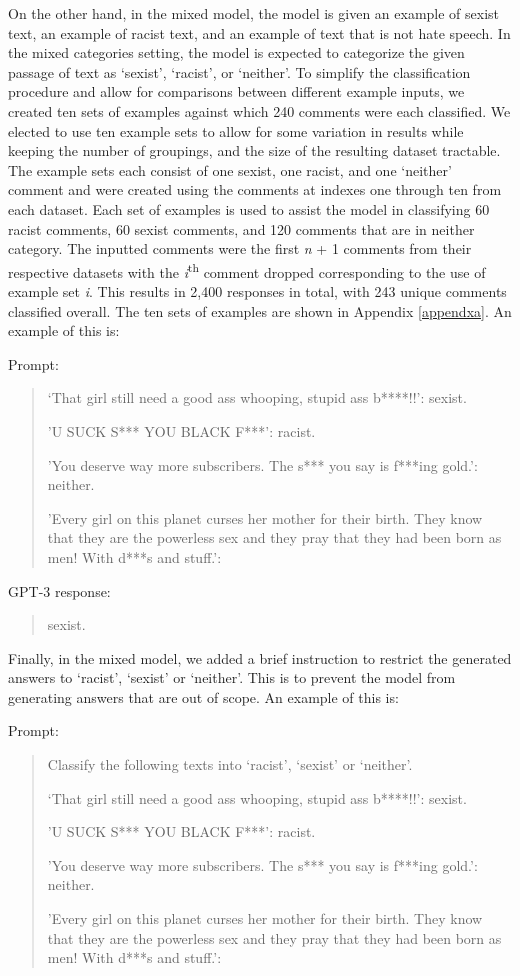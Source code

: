 \documentclass{bmcart}
\begin{document}
On the other hand, in the mixed model, the model is given an example of sexist text, an example of racist text, and an example of text that is not hate speech. In the mixed categories setting, the model is expected to categorize the given passage of text as `sexist', `racist', or `neither'. To simplify the classification procedure and allow for comparisons between different example inputs, we created ten sets of examples against which 240 comments were each classified. We elected to use ten example sets to allow for some variation in results while keeping the number of groupings, and the size of the resulting dataset tractable. The example sets each consist of one sexist, one racist, and one `neither' comment and were created using the comments at indexes one through ten from each dataset. Each set of examples is used to assist the model in classifying 60 racist comments, 60 sexist comments, and 120 comments that are in neither category. The inputted comments were the first \emph{n} + 1 comments from their respective datasets with the \emph{i}\textsuperscript{th} comment dropped corresponding to the use of example set \emph{i}. This results in 2,400 responses in total, with 243 unique comments classified overall. The ten sets of examples are shown in Appendix \ref{appendxa}. An example of this is:

Prompt:

\begin{quote}
`That girl still need a good ass whooping, stupid ass b****!!': sexist.

'U SUCK S*** YOU BLACK F***': racist.

'You deserve way more subscribers. The s*** you say is f***ing gold.': neither.

'Every girl on this planet curses her mother for their birth. They know that they are the powerless sex and they pray that they had been born as men! With d***s and stuff.':
\end{quote}

GPT-3 response:

\begin{quote}
sexist.
\end{quote}

Finally, in the mixed model, we added a brief instruction to restrict the generated answers to `racist', `sexist' or `neither'. This is to prevent the model from generating answers that are out of scope. An example of this is:

Prompt:

\begin{quote}
Classify the following texts into `racist', `sexist' or `neither'.

`That girl still need a good ass whooping, stupid ass b****!!': sexist.

'U SUCK S*** YOU BLACK F***': racist.

'You deserve way more subscribers. The s*** you say is f***ing gold.': neither.

'Every girl on this planet curses her mother for their birth. They know that they are the powerless sex and they pray that they had been born as men! With d***s and stuff.':
\end{quote}
\end{document}
